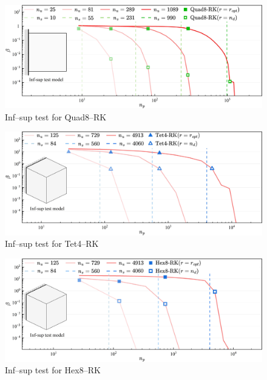 \begin{figure}[H]
\centering
\includegraphics[width=\textwidth]{pdf/quad8.pdf}\caption{Inf--sup test for Quad8--RK}\label{fg:infsup_convergence_2D_d}
\end{figure}

\begin{figure}[H]
\centering
\includegraphics[width=\textwidth]{pdf/Tet4.pdf}\caption{Inf--sup test for Tet4--RK}\label{fg:infsup_convergence_3D_a}
\end{figure}

\begin{figure}[H]
\centering
\includegraphics[width=\textwidth]{pdf/Hex8.pdf}\caption{Inf--sup test for Hex8--RK}\label{fg:infsup_convergence_3D_b}
\end{figure}

